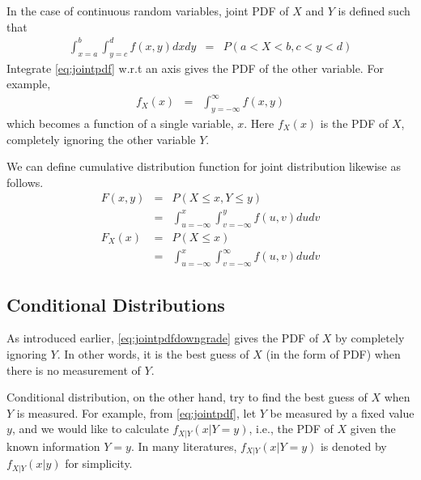 In the case of continuous random variables, joint PDF of $X$ and $Y$ is defined such that
\begin{eqnarray}
  \int_{x=a}^{b}\int_{y=c}^{d} f(x, y) dxdy &=& P\left(a < X < b, c < y < d \right) \label{eq:jointpdf}
\end{eqnarray}
Integrate \eqref{eq:jointpdf} w.r.t an axis gives the PDF of the other variable. For example,
\begin{eqnarray}
  f_X(x) &=& \int_{y=-\infty}^{\infty} f(x, y) \label{eq:jointpdfdowngrade}
\end{eqnarray}
which becomes a function of a single variable, $x$. Here $f_X(x)$ is the PDF of $X$, completely ignoring the other variable $Y$.

We can define cumulative distribution function for joint distribution likewise as follows.
\begin{eqnarray}
  F(x, y) &=& P(X \leq x, Y \leq y) \nonumber \\
  &=& \int_{u=-\infty}^{x}\int_{v=-\infty}^{y}f(u, v)dudv \nonumber \\
  F_X(x) &=& P(X \leq x) \nonumber \\
  &=& \int_{u=-\infty}^{x}\int_{v=-\infty}^{\infty}f(u, v)dudv \nonumber
\end{eqnarray}

\subsection{Conditional Distributions}

As introduced earlier, \eqref{eq:jointpdfdowngrade} gives the PDF of $X$ by completely ignoring $Y$. In other words, it is the best guess of $X$ (in the form of PDF) when there is no measurement of $Y$.

Conditional distribution, on the other hand, try to find the best guess of $X$ when $Y$ is measured. For example, from \eqref{eq:jointpdf}, let $Y$ be measured by a fixed value $y$, and we would like to calculate $f_{X|Y}(x |Y=y)$, i.e., the PDF of $X$ given the known information $Y=y$. In many literatures, $f_{X|Y}(x |Y=y)$ is denoted by $f_{X|Y}(x|y)$ for simplicity.


